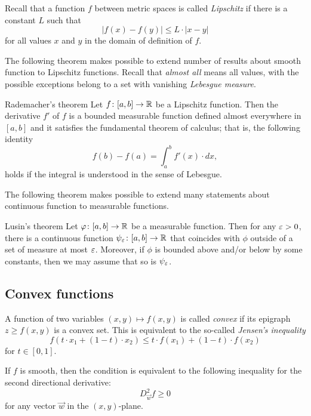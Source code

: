 Recall that a function $f$ between metric spaces is called \emph{Lipschitz} if there is a constant $L$ such that 
\[|f(x)-f(y)|\le L\cdot|x-y|\]
for all values $x$ and $y$ in the domain of definition of $f$.

The following theorem makes possible to extend number of results about smooth function to Lipschitz functions.
Recall that {}\emph{almost all} means all values, with the possible exceptions belong to a set with vanishing {}\emph{Lebesgue measure}.

\begin{thm}{Rademacher's theorem}\label{thm:rademacher}
Let $f\colon[a,b]\to\mathbb{R}$ be a Lipschitz function.
Then the derivative $f'$ of $f$ is a bounded measurable function defined almost everywhere in $[a,b]$ and it satisfies the fundamental theorem of calculus; that is, the following identity 
\[f(b)-f(a)=\int_a^b f'(x)\cdot dx,\]
holds if the integral is understood in the sense of Lebesgue.
\end{thm}

The following theorem makes possible to extend many statements about continuous function to measurable functions.

\begin{thm}{Lusin's theorem}\label{thm:lusin}
Let $\varphi\colon[a,b]\to \mathbb{R}$ be a measurable function.
Then for any $\varepsilon>0$, there is a continuous function $\psi_\varepsilon\colon[a,b]\to \mathbb{R}$ that coincides with $\phi$ outside of a set of measure at most $\varepsilon$.
Moreover, if $\phi$ is bounded above and/or below by some constants, then we may assume that so is $\psi_\varepsilon$.  
\end{thm}

\subsection*{Convex functions}

A function of two variables $(x,y)\mapsto f(x,y)$ is called \emph{convex} if 
its epigraph $z\ge f(x,y)$ is a convex set.
This is equivalent to the so-called \emph{Jensen's inequality}
\[f \left (t\cdot x_1 + (1-t)\cdot x_2 \right ) \leq t\cdot f(x_1)+ (1-t)\cdot f(x_2)\]
for $t\in[0,1]$.

If $f$ is smooth, then the condition is equivalent to the following inequality for the second directional derivative:
\[D^2_{\vec w}f\ge 0\]
for any vector $\vec w$ in the $(x,y)$-plane.

